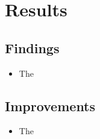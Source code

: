 \documentclass[Bachelorarbeit.tex]{subfiles}
\begin{document}
\chapter{Results}

\section{Findings}
\begin{itemize}
\item The 
\end{itemize}

\section{Improvements}
\begin{itemize}
\item The 
\end{itemize}
\end{document}
